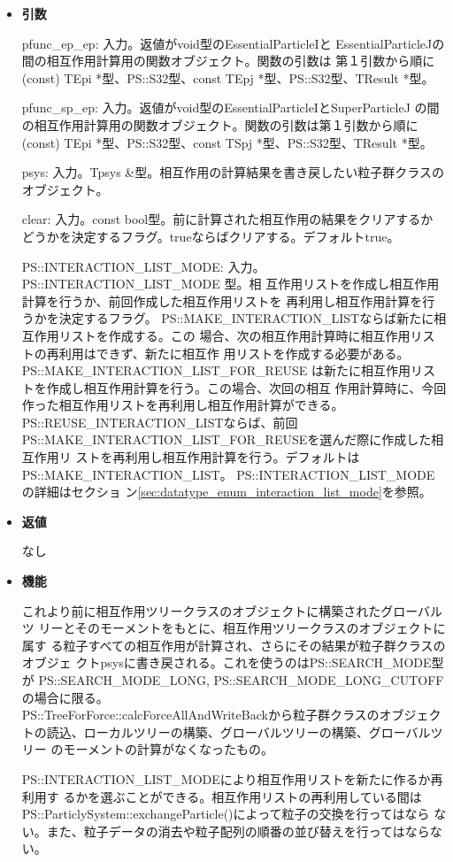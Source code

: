 \begin{itemize}

\item {\bf 引数}

pfunc\_ep\_ep: 入力。返値がvoid型のEssentialParticleIと
EssentialParticleJの間の相互作用計算用の関数オブジェクト。関数の引数は
第１引数から順に(const) TEpi *型、PS::S32型、const
TEpj *型、PS::S32型、TResult *型。

pfunc\_sp\_ep: 入力。返値がvoid型のEssentialParticleIとSuperParticleJ
の間の相互作用計算用の関数オブジェクト。関数の引数は第１引数から順に
(const) TEpi *型、PS::S32型、const TSpj *型、PS::S32型、TResult *型。

psys: 入力。Tpsys \&型。相互作用の計算結果を書き戻したい粒子群クラスの
オブジェクト。

clear: 入力。const bool型。前に計算された相互作用の結果をクリアするか
どうかを決定するフラグ。trueならばクリアする。デフォルトtrue。

PS::INTERACTION\_LIST\_MODE: 入力。PS::INTERACTION\_LIST\_MODE 型。相
互作用リストを作成し相互作用計算を行うか、前回作成した相互作用リストを
再利用し相互作用計算を行うかを決定するフラグ。
PS::MAKE\_INTERACTION\_LISTならば新たに相互作用リストを作成する。この
場合、次の相互作用計算時に相互作用リストの再利用はできず、新たに相互作
用リストを作成する必要がある。PS::MAKE\_INTERACTION\_LIST\_FOR\_REUSE
は新たに相互作用リストを作成し相互作用計算を行う。この場合、次回の相互
作用計算時に、今回作った相互作用リストを再利用し相互作用計算ができる。
PS::REUSE\_INTERACTION\_LISTならば、前回
PS::MAKE\_INTERACTION\_LIST\_FOR\_REUSEを選んだ際に作成した相互作用リ
ストを再利用し相互作用計算を行う。デフォルトはPS::MAKE\_INTERACTION\_LIST。
PS::INTERACTION\_LIST\_MODEの詳細はセクショ
ン\ref{sec:datatype_enum_interaction_list_mode}を参照。

\item {\bf 返値}

なし

\item {\bf 機能}

これより前に相互作用ツリークラスのオブジェクトに構築されたグローバルツ
リーとそのモーメントをもとに、相互作用ツリークラスのオブジェクトに属す
る粒子すべての相互作用が計算され、さらにその結果が粒子群クラスのオブジェ
クトpsysに書き戻される。これを使うのはPS::SEARCH\_MODE型が
PS::SEARCH\_MODE\_LONG, PS::SEARCH\_MODE\_LONG\_CUTOFFの場合に限る。\\
PS::TreeForForce::calcForceAllAndWriteBackから粒子群クラスのオブジェク
トの読込、ローカルツリーの構築、グローバルツリーの構築、グローバルツリー
のモーメントの計算がなくなったもの。

PS::INTERACTION\_LIST\_MODEにより相互作用リストを新たに作るか再利用す
るかを選ぶことができる。相互作用リストの再利用している間は
PS::ParticlySystem::exchangeParticle()によって粒子の交換を行ってはなら
ない。また、粒子データの消去や粒子配列の順番の並び替えを行ってはならな
い。

\end{itemize}

